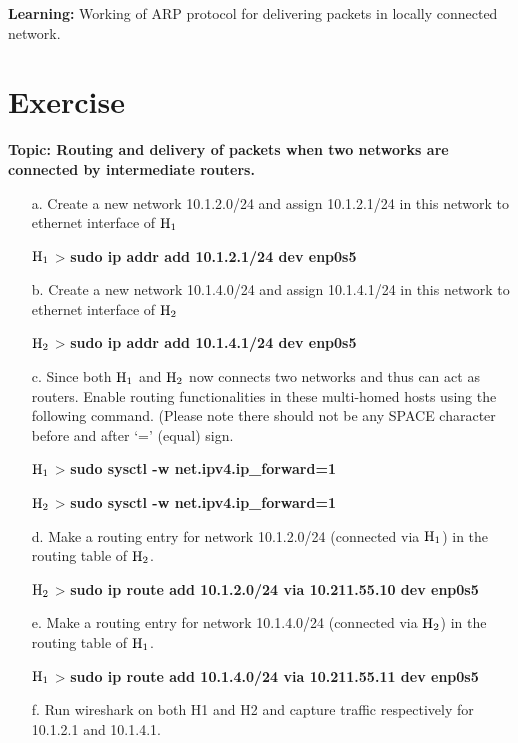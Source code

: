 \begin{multicols}{2}
\textbf{Learning:} Working of ARP protocol for delivering packets in locally connected network.

\section*{Exercise }\label{chap2-exe2}

\textbf{Topic: Routing and delivery of packets when two networks are connected by intermediate routers.}

\begin{itemize}
\item[a.] Create a new network 10.1.2.0/24 and assign 10.1.2.1/24 in this network to ethernet interface of ${\rm H}_{1}$

${\rm H}_{1}$ > \textbf{sudo ip addr add 10.1.2.1/24 dev enp0s5}

\item[b.] Create a new network 10.1.4.0/24 and assign 10.1.4.1/24 in this network to ethernet interface of ${\rm H}_{2}$

${\rm H}_{2}$ > \textbf{sudo ip addr add 10.1.4.1/24 dev enp0s5}

\item[c.] Since both ${\rm H}_{1}$ and ${\rm H}_{2}$ now connects two networks and thus can act as routers. Enable routing functionalities in these multi-homed hosts using the following command. (Please note there should not be any SPACE character before and after ‘=’ (equal) sign.

${\rm H}_{1}$ > \textbf{sudo sysctl -w net.ipv4.ip\_forward=1}

${\rm H}_{2}$ > \textbf{sudo sysctl -w net.ipv4.ip\_forward=1}

\item[d.] Make a routing entry for network 10.1.2.0/24 (connected via ${\rm H}_{1}$) in the routing table of ${\rm H}_{2}$.

${\rm H}_{2}$ > \textbf{sudo ip route add 10.1.2.0/24 via 10.211.55.10 dev enp0s5}

\item[e.] Make a routing entry for network 10.1.4.0/24 (connected via ${\rm H}_{2}$) in the routing table of ${\rm H}_{1}$.

${\rm H}_{1}$ > \textbf{sudo ip route add 10.1.4.0/24 via 10.211.55.11 dev enp0s5}

\item[f.] Run wireshark on both H1 and H2 and capture traffic respectively for 10.1.2.1 and 10.1.4.1.


\end{itemize}
\end{multicols}
